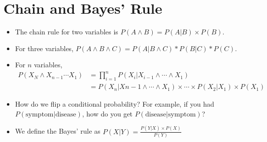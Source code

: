 \documentclass{article}
\begin{document}
\section{Chain and Bayes' Rule}
\begin{itemize}
    \item The chain rule for two variables is $P(A \wedge B) = P(A | B) \times P(B)$.
    \item For three variables, $P(A \wedge B \wedge C) = P(A|B \wedge C) * P(B|C) * P(C)$.
    \item For $n$ variables,
        \begin{align*}
            P(X_N \wedge X_{n-1} \cdots X_1) 
            &= \prod^n_{i=1}P(X_i|X_{i-1}\wedge \cdots \wedge X_1) \\
            &= P(X_n|X{n-1}\wedge \cdots \wedge X_1) \times \cdots \times P(X_2|X_1) \times P(X_1)
        \end{align*}
    \item How do we flip a conditional probability?  For example, if you had $P(\text{symptom} | \text{disease})$, how do you get $P(\text{disease}|\text{symptom})$?
    \item We define the Bayes' rule as $P(X|Y) = \frac{P(Y|X) \times P(X)}{P(Y)}$
\end{itemize}
\end{document}
